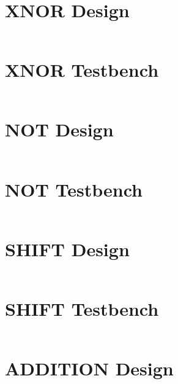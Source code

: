 \documentclass[
	letterpaper, %
	10pt, %
]{CSUniSchoolLabReport}
\begin{document}
\section{XNOR Design}
\begin{center}
    \inputminted{octave}{verilog/xnor_4b/xnor_4b.v} %
\end{center}
\section{XNOR Testbench}
\begin{center}
    \inputminted{octave}{verilog/xnor_4b/xnor_4b_test.v} %
\end{center}

\section{NOT Design}
\begin{center}
    \inputminted{octave}{verilog/not_4b/not_4b.v} %
\end{center}
\section{NOT Testbench}
\begin{center}
    \inputminted{octave}{verilog/not_4b/not_4b_test.v} %
\end{center}

\section{SHIFT Design}
\begin{center}
    \inputminted{octave}{verilog/shift_4b/shift_4b.v} %
\end{center}
\section{SHIFT Testbench}
\begin{center}
    \inputminted{octave}{verilog/shift_4b/shift_4b_test.v} %
\end{center}

\section{ADDITION Design}
\begin{center}
    \inputminted{octave}{verilog/add_4b/add_4b.v} %
\end{center}
\end{document}
